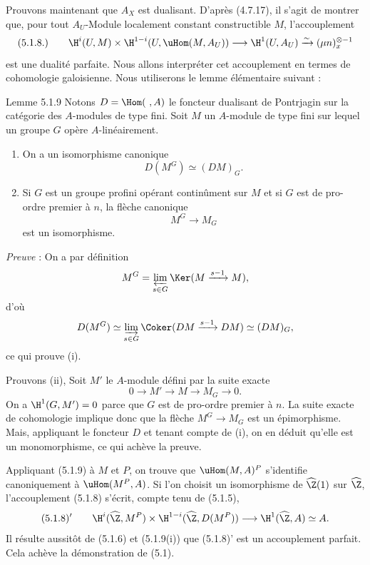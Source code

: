 Prouvons maintenant que $A_X$ est dualisant. D'après (4.7.17), il s'agit de montrer que, pour tout $A_U$-Module localement constant constructible $M$, l'accouplement
\[
(5.1.8.)\qquad \H^i(U,M)\times\H^{1-i}(U,\uHom(M,A_U))\longrightarrow \H^1(U,A_U)\xrightarrow{\sim}(\mu n)_x^{\otimes -1}
\]
est une dualité parfaite. Nous allons interpréter cet accouplement en termes de cohomologie galoisienne. Nous utiliserons le lemme élémentaire suivant :

\begin{statement}{Lemme 5.1.9}
Notons $D=\Hom(\ ,A)$ le foncteur dualisant de Pontrjagin sur la catégorie des $A$-modules de type fini. Soit $M$ un $A$-module de type fini sur lequel un groupe $G$ opère $A$-linéairement.
\begin{enumerate}[label=(\roman*)]
\item On a un isomorphisme canonique
\[
D(M^G)\simeq (DM)_G.
\]
\item Si $G$ est un groupe profini opérant continûment sur $M$ et si $G$ est de pro-ordre premier à $n$, la flèche canonique
\[
M^G\longrightarrow M_G
\]
est un isomorphisme.
\end{enumerate}
\end{statement}

\emph{Preuve} : On a par définition
\[
M^G=\varprojlim_{s\in G}\Ker(M\xrightarrow{s-1}M),
\]
d'où
\[
D(M^G)\simeq \varinjlim_{s\in G}\Coker(DM\xrightarrow{s-1}DM)\simeq (DM)_G,
\]
ce qui prouve (i).

Prouvons (ii), Soit $M'$ le $A$-module défini par la suite exacte
\[
0\longrightarrow M'\longrightarrow M\longrightarrow M_G\longrightarrow0.
\]
On a $\H^1(G,M')=0$ parce que $G$ est de pro-ordre premier à $n$. La suite exacte de cohomologie implique donc que la flèche $M^G\to M_G$ est un épimorphisme. Mais, appliquant le foncteur $D$ et tenant compte de (i), on en déduit qu'elle est un monomorphisme, ce qui achève la preuve.

Appliquant (5.1.9) à $M$ et $P$, on trouve que $\uHom(M,A)^P$ s'identifie canoniquement à $\uHom(M^P,A)$. Si l'on choisit un isomorphisme de $\widehat{\Z}(1)$ sur $\widehat{\Z}$, l'accouplement (5.1.8) s'écrit, compte tenu de (5.1.5),
\[
(5.1.8)'\qquad \H^i(\widehat{\Z},M^P)\times\H^{1-i}(\widehat{\Z},D(M^P))\longrightarrow\H^1(\widehat{\Z},A)\simeq A.
\]
Il résulte aussitôt de (5.1.6) et (5.1.9(i)) que (5.1.8)' est un accouplement parfait. Cela achève la démonstration de (5.1).

